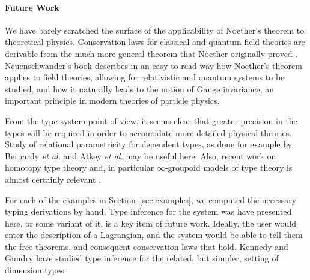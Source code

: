 \documentclass{sigplanconf}
\theoremstyle{examplestyle}
\begin{document}
\paragraph{Future Work} We have barely scratched the surface of the
applicability of Noether's theorem to theoretical
physics. Conservation laws for classical and quantum field theories
are derivable from the much more general theorem that Noether
originally proved \cite{noether71}. Neuenschwander's book
\cite{neuenschwander11} describes in an easy to read way how Noether's
theorem applies to field theories, allowing for relativistic and
quantum systems to be studied, and how it naturally leads to the
notion of Gauge invariance, an important principle in modern theories
of particle physics.

From the type system point of view, it seems clear that greater
precision in the types will be required in order to accomodate more
detailed physical theories. Study of relational parametricity for
dependent types, as done for example by Bernardy \emph{et al.}
\cite{bernardy12proofs} and Atkey \emph{et al.}
\cite{atkey14relational} may be useful here. Also, recent work on
homotopy type theory and, in particular $\infty$-groupoid models of
type theory is almost certainly relevant \cite{hottbook2013}.

For each of the examples in Section~\ref{sec:examples}, we computed
the necessary typing derivations by hand. Type inference for the
system was have presented here, or some variant of it, is a key item
of future work. Ideally, the user would enter the description of a
Lagrangian, and the system would be able to tell them the free
theorems, and consequent conservation laws that hold. Kennedy
\cite{kennedy94} and Gundry \cite{gundry11} have studied type
inference for the related, but simpler, setting of dimension types.
\end{document}
